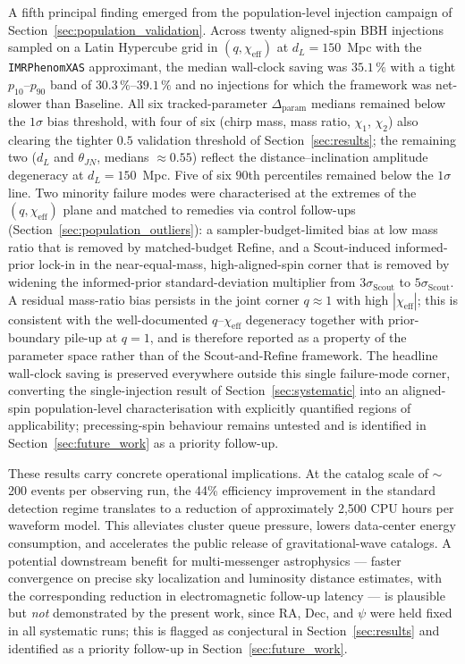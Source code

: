 \documentclass[12pt]{article}
\begin{document}
A fifth principal finding emerged from the population-level injection campaign of Section~\ref{sec:population_validation}. Across twenty aligned-spin BBH injections sampled on a Latin Hypercube grid in $(q, \chi_{\mathrm{eff}})$ at $d_L = 150$~Mpc with the \texttt{IMRPhenomXAS} approximant, the median wall-clock saving was $35.1\,\%$ with a tight $p_{10}$--$p_{90}$ band of $30.3\,\%$--$39.1\,\%$ and no injections for which the framework was net-slower than Baseline. All six tracked-parameter $\Delta_{\mathrm{param}}$ medians remained below the $1\sigma$ bias threshold, with four of six (chirp mass, mass ratio, $\chi_1$, $\chi_2$) also clearing the tighter $0.5$ validation threshold of Section~\ref{sec:results}; the remaining two ($d_L$ and $\theta_{JN}$, medians $\approx 0.55$) reflect the distance--inclination amplitude degeneracy at $d_L = 150$~Mpc. Five of six $90$th percentiles remained below the $1\sigma$ line. Two minority failure modes were characterised at the extremes of the $(q, \chi_{\mathrm{eff}})$ plane and matched to remedies via control follow-ups (Section~\ref{sec:population_outliers}): a sampler-budget-limited bias at low mass ratio that is removed by matched-budget Refine, and a Scout-induced informed-prior lock-in in the near-equal-mass, high-aligned-spin corner that is removed by widening the informed-prior standard-deviation multiplier from $3\sigma_{\mathrm{Scout}}$ to $5\sigma_{\mathrm{Scout}}$. A residual mass-ratio bias persists in the joint corner $q\!\approx\!1$ with high $|\chi_{\mathrm{eff}}|$; this is consistent with the well-documented $q$--$\chi_{\mathrm{eff}}$ degeneracy \citep{Hannam2013,Vitale2014,Purrer2016} together with prior-boundary pile-up at $q = 1$, and is therefore reported as a property of the parameter space rather than of the Scout-and-Refine framework. The headline wall-clock saving is preserved everywhere outside this single failure-mode corner, converting the single-injection result of Section~\ref{sec:systematic} into an aligned-spin population-level characterisation with explicitly quantified regions of applicability; precessing-spin behaviour remains untested and is identified in Section~\ref{sec:future_work} as a priority follow-up.

These results carry concrete operational implications. At the catalog scale of $\sim$200 events per observing run, the 44\% efficiency improvement in the standard detection regime translates to a reduction of approximately 2,500 CPU hours per waveform model. This alleviates cluster queue pressure, lowers data-center energy consumption, and accelerates the public release of gravitational-wave catalogs. A potential downstream benefit for multi-messenger astrophysics --- faster convergence on precise sky localization and luminosity distance estimates, with the corresponding reduction in electromagnetic follow-up latency --- is plausible but \emph{not} demonstrated by the present work, since RA, Dec, and $\psi$ were held fixed in all systematic runs; this is flagged as conjectural in Section~\ref{sec:results} and identified as a priority follow-up in Section~\ref{sec:future_work}.
\end{document}
